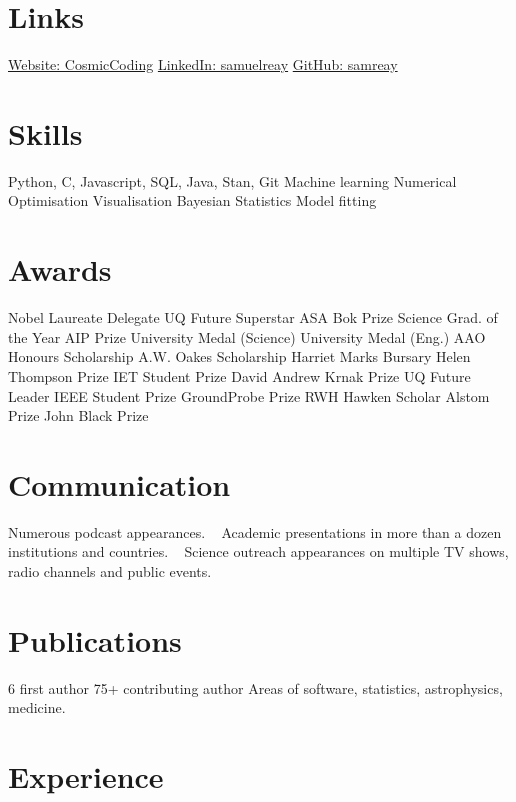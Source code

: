 \documentclass[]{friggeri-cv2}
\begin{document}
\pagestyle{plain}



\begin{aside}
\section{Links}
\href{https://cosmiccoding.com.au}{Website: CosmicCoding}
\href{https://www.linkedin.com/in/samuelreay/}{LinkedIn: samuelreay}
\href{https://github.com/samreay}{GitHub: samreay}
\section{Skills}
Python, C, Javascript, SQL, Java, Stan, Git
Machine learning
Numerical Optimisation
Visualisation
Bayesian Statistics
Model fitting
\section{Awards}
Nobel Laureate Delegate
UQ Future Superstar
ASA Bok Prize
Science Grad. of the Year
AIP Prize
University Medal (Science)
University Medal (Eng.)
AAO Honours Scholarship
A.W. Oakes Scholarship
Harriet Marks Bursary
Helen Thompson Prize
IET Student Prize
David Andrew Krnak Prize
UQ Future Leader
IEEE Student Prize
GroundProbe Prize
RWH Hawken Scholar
Alstom Prize
John Black Prize
\section{Communication}
Numerous podcast appearances.
~
Academic presentations in more than a dozen institutions and countries.
~
Science outreach appearances on multiple TV shows, radio channels and public events.
\section{Publications}
6 first author
75+ contributing author
Areas of software, statistics, astrophysics, medicine.
\end{aside}


\section{Experience}
\end{document}
